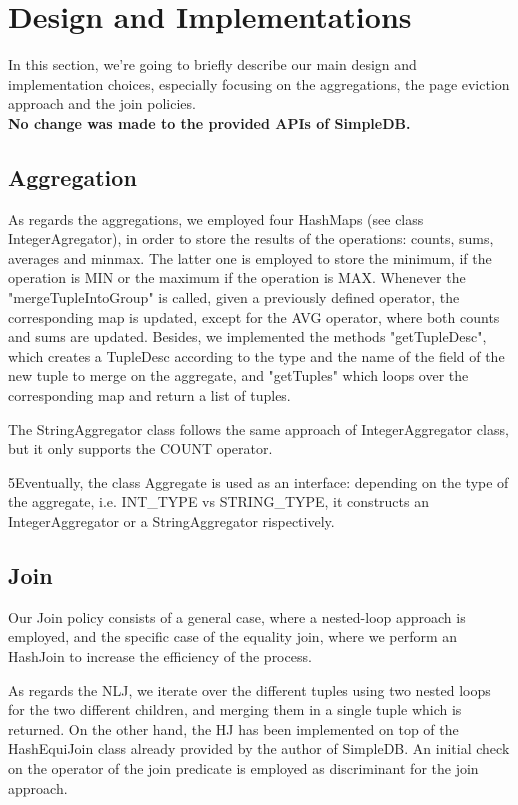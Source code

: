 \documentclass{article}
\begin{document}


\section{Design and Implementations}
In this section, we're going to briefly describe our main design and implementation choices, especially focusing on the aggregations, the page eviction approach and the join policies. \\
\textbf{No change was made to the provided APIs of SimpleDB.}

\subsection{Aggregation}
As regards the aggregations, we employed four HashMaps (see class IntegerAgregator), in order to store the results of the operations: counts, sums, averages and minmax. The latter one is employed to store the minimum, if the operation is MIN or the maximum if the operation is MAX. Whenever the "mergeTupleIntoGroup" is called, given a previously defined operator, the corresponding map is updated, except for the AVG operator, where both counts and sums are updated. Besides, we implemented the methods "getTupleDesc", which creates a TupleDesc according to the type and the name of the field of the new tuple to merge on the aggregate, and "getTuples" which loops over the corresponding map and return a list of tuples. 

The StringAggregator class follows the same approach of IntegerAggregator class, but it only supports the COUNT operator. 

5Eventually, the class Aggregate is used as an interface: depending on the type of the aggregate, i.e. INT\_TYPE vs STRING\_TYPE, it constructs an IntegerAggregator or a StringAggregator rispectively.

\subsection{Join}
Our Join policy consists of a general case, where a nested-loop approach is employed, and the specific case of the equality join, where we perform an HashJoin to increase the efficiency of the process. 

As regards the NLJ, we iterate over the different tuples using two nested loops for the two different children, and merging them in a single tuple which is returned. 
On the other hand, the HJ has been implemented on top of the  HashEquiJoin class already provided by the author of SimpleDB. An initial check on the operator of the join predicate is employed as  discriminant for the join approach.
\end{document}
